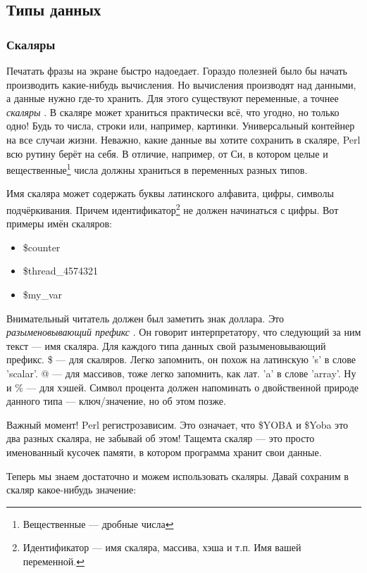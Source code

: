 \subsection{Типы данных}
\subsubsection{Скаляры}

Печатать фразы на экране быстро надоедает. Гораздо полезней было бы 
начать производить какие-нибудь вычисления. Но вычисления производят над 
данными, а данные нужно где-то хранить. Для этого существуют переменные, а 
точнее \emph{скаляры} . В скаляре может храниться практически всё, что 
угодно, но только одно! Будь то числа, строки или, например, картинки. 
Универсальный контейнер на все случаи жизни. Неважно, какие данные вы 
хотите сохранить в скаляре, Perl всю рутину берёт на себя. В отличие, 
например, от Си, в котором целые и вещественные\footnote{Вещественные --- 
дробные числа} числа должны храниться в переменных разных типов.

Имя скаляра может содержать буквы латинского алфавита, цифры, символы 
подчёркивания. Причем идентификатор\footnote{Идентификатор --- имя скаляра, 
массива, хэша и т.п. Имя вашей переменной.} не должен начинаться с цифры. 
Вот примеры имён скаляров:

\begin{itemize}
\item \$counter
\item \$thread\_4574321
\item \$my\_var
\end{itemize}

Внимательный читатель должен был заметить знак доллара. Это 
\emph{разыменовывающий префикс} . Он говорит интерпретатору, что следующий 
за ним текст --- имя скаляра. Для каждого типа данных свой разыменовывающий 
префикс. \$ --- для скаляров. Легко запомнить, он похож на латинскую ’s’ в 
слове ’scalar’. @ --- для массивов, тоже легко запомнить, как лат. ’a’ в слове 
’array’. Ну и \% --- для хэшей. Символ процента должен напоминать о двойственной
природе данного типа --- ключ/значение, но об этом позже.

Важный момент! Perl регистрозависим. Это означает, что \$YOBA и \$Yoba это два 
разных скаляра, не забывай об этом! Тащемта скаляр --- это просто 
именованный кусочек памяти, в котором программа хранит свои данные.

Теперь мы знаем достаточно и можем использовать скаляры. Давай сохраним в скаляр
какое-нибудь значение:

